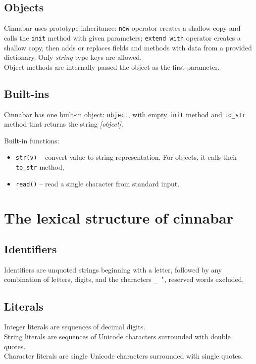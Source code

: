 \documentclass[a4paper,11pt]{article}
\begin{document}
\subsection*{Objects}

Cinnabar uses prototype inheritance: {\tt new} operator creates a shallow copy and calls the {\tt init} method with given parameters; {\tt extend with} operator creates a shallow copy, then adds or replaces fields and methods with data from a provided dictionary. Only \emph{string} type keys are allowed.\\
Object methods are internally passed the object as the first parameter.

\subsection*{Built-ins}
Cinnabar has one built-in object: {\tt object}, with empty {\tt init} method and {\tt to\_str} method that returns the string \emph{[object]}.

Built-in functions:
\begin{itemize}
\item {\tt str(v)} -- convert value to string representation. For objects, it calls their {\tt to\_str} method,
\item {\tt read()} -- read a single character from standard input.
\end{itemize}


\section*{The lexical structure of cinnabar}
\subsection*{Identifiers}
Identifiers  are unquoted strings beginning with a letter,
followed by any combination of letters, digits, and the characters {\tt \_ '},
reserved words excluded.


\subsection*{Literals}

Integer literals  are sequences of decimal digits.\\
String literals  are sequences of Unicode characters surrounded with double quotes.\\
Character literals  are single Unicode characters surrounded with single quotes.
\end{document}
